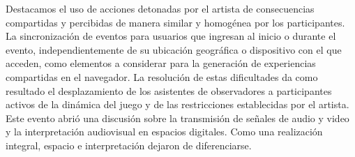 Destacamos el uso de acciones detonadas por el artista de consecuencias compartidas y percibidas de manera similar y homogénea por los participantes. La sincronización de eventos para usuarios que ingresan al inicio o durante el evento, independientemente de su ubicación geográfica o dispositivo con el que acceden, como elementos a considerar para la generación de experiencias compartidas en el navegador. La resolución de estas dificultades da como resultado el desplazamiento de los asistentes de observadores a participantes activos de la dinámica del juego y de las restricciones establecidas por el artista. Este evento abrió una discusión sobre la transmisión de señales de audio y video y la interpretación audiovisual en espacios digitales. Como una realización integral, espacio e interpretación dejaron de diferenciarse. 

